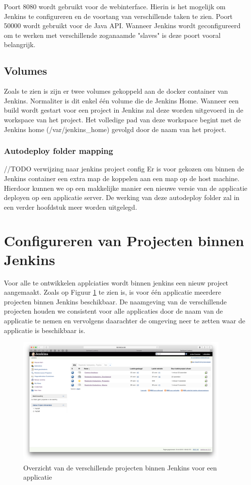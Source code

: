 Poort 8080 wordt gebruikt voor de webinterface. Hierin is het mogelijk om Jenkins te configureren en de voortang van verschillende taken te zien. Poort 50000 wordt gebruikt voor de Java API. Wanneer Jenkins wordt geconfigureerd om te werken met verschillende zoganaamde "slaves" is deze poort vooral belangrijk.

\subsection{Volumes}
Zoals te zien is zijn er twee volumes gekoppeld aan de docker container van Jenkins. Normaliter is dit enkel één volume die de Jenkins Home. Wanneer een build wordt gestart voor een project in Jenkins zal deze worden uitgevoerd in de workspace van het project. Het volledige pad van deze workspace begint met de Jenkins home (/var/jenkins\_home) gevolgd door de naam van het project.

\subsubsection{Autodeploy folder mapping}
//TODO verwijzing naar jenkins project config
Er is voor gekozen om binnen de Jenkins container een extra map de koppelen aan een map op de host machine. Hierdoor kunnen we op een makkelijke manier een nieuwe versie van de applicatie deployen op een applicatie server. De werking van deze autodeploy folder zal in een verder hoofdstuk meer worden uitgelegd.

\section{Configureren van Projecten binnen Jenkins}
Voor alle te ontwikkelen applciaties wordt binnen jenkins een nieuw project aangemaakt. Zoals op Figuur \ref{fig:JenkinsProjectOverview} te zien is, is voor één applicatie meerdere projecten binnen Jenkins beschikbaar. De naamgeving van de verschillende projecten houden we consistent voor alle applicaties door de naam van de applicatie te nemen en vervolgens daarachter de omgeving neer te zetten waar de applicatie is beschikbaar is.

\begin{figure}[H]
	\centering
	\includegraphics[width=0.95\textwidth]{img/JenkinsProjectOverview.png}
	\caption{Overzicht van de verschillende projecten binnen Jenkins voor een applicatie}
	\label{fig:JenkinsProjectOverview}
\end{figure}

